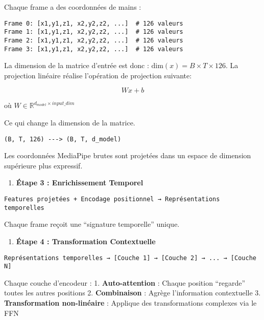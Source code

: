 \documentclass[12pt]{article}
\providecommand{\tightlist}{%
      \setlength{\itemsep}{0pt}\setlength{\parskip}{0pt}}
\begin{document}
Chaque frame a des coordonnées de mains :

\begin{verbatim}
Frame 0: [x1,y1,z1, x2,y2,z2, ...]  # 126 valeurs
Frame 1: [x1,y1,z1, x2,y2,z2, ...]  # 126 valeurs  
Frame 2: [x1,y1,z1, x2,y2,z2, ...]  # 126 valeurs
Frame 3: [x1,y1,z1, x2,y2,z2, ...]  # 126 valeurs
\end{verbatim}

La dimension de la matrice d'entrée est donc : $ \text{dim}(x) = B
\times T \times 126 $. La projection linéaire réalise l'opération de
projection suivante:

\[
Wx + b
\]

où \(W \in \mathbb{R}^{d_{model} \times input\_dim}\)

Ce qui change la dimension de la matrice.

\begin{verbatim}
(B, T, 126) ---> (B, T, d_model)
\end{verbatim}

Les coordonnées MediaPipe brutes sont projetées dans un espace de
dimension supérieure plus expressif.

\begin{enumerate}
\def\labelenumi{\arabic{enumi}.}
\setcounter{enumi}{2}
\tightlist
\item
  \textbf{Étape 3 : Enrichissement Temporel}
\end{enumerate}

\begin{verbatim}
Features projetées + Encodage positionnel → Représentations temporelles
\end{verbatim}

Chaque frame reçoit une ``signature temporelle'' unique.

\begin{enumerate}
\def\labelenumi{\arabic{enumi}.}
\setcounter{enumi}{3}
\tightlist
\item
  \textbf{Étape 4 : Transformation Contextuelle}
\end{enumerate}

\begin{verbatim}
Représentations temporelles → [Couche 1] → [Couche 2] → ... → [Couche N]
\end{verbatim}

Chaque couche d'encodeur : 1. \textbf{Auto-attention} : Chaque position
``regarde'' toutes les autres positions 2. \textbf{Combinaison} : Agrège
l'information contextuelle 3. \textbf{Transformation non-linéaire} :
Applique des transformations complexes via le FFN
\end{document}
